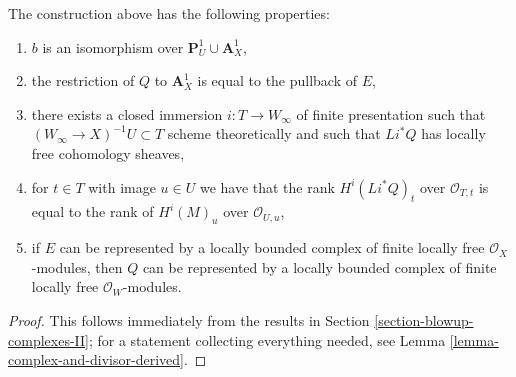\begin{lemma}
\label{lemma-graph-construction}
The construction above has the following properties:
\begin{enumerate}
\item $b$ is an isomorphism over $\mathbf{P}^1_U \cup \mathbf{A}^1_X$,
\item the restriction of $Q$ to $\mathbf{A}^1_X$
is equal to the pullback of $E$,
\item there exists a closed immersion $i : T \to W_\infty$
of finite presentation such that $(W_\infty \to X)^{-1}U \subset T$
scheme theoretically and such that $Li^*Q$ has locally free cohomology
sheaves,
\item for $t \in T$ with image $u \in U$ we have that the
rank $H^i(Li^*Q)_t$ over $\mathcal{O}_{T, t}$ is equal to the rank
of $H^i(M)_u$ over $\mathcal{O}_{U, u}$,
\item if $E$ can be represented by a locally bounded complex of
finite locally free $\mathcal{O}_X$-modules, then $Q$ can be represented
by a locally bounded complex of finite locally free $\mathcal{O}_W$-modules.
\end{enumerate}
\end{lemma}

\begin{proof}
This follows immediately from the results in
Section \ref{section-blowup-complexes-II}; for a statement
collecting everything needed, see
Lemma \ref{lemma-complex-and-divisor-derived}.
\end{proof}


















